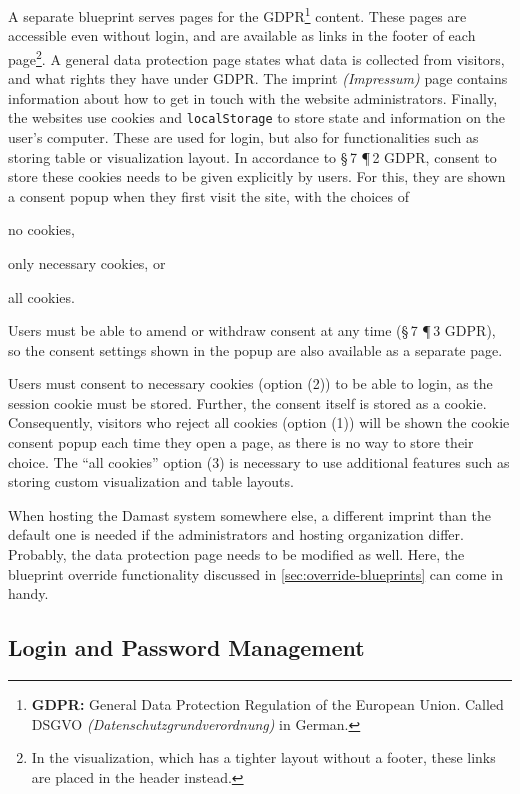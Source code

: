 A separate blueprint serves pages for the GDPR\footnote{
  \textbf{GDPR:} General Data Protection Regulation of the European Union.
  Called DSGVO \emph{(Datenschutzgrundverordnung)} in German.
}
content.
These pages are accessible even without login, and are available as links in the footer of each page\footnote{
  In the visualization, which has a tighter layout without a footer, these links are placed in the header instead.
}.
A general data protection page states what data is collected from visitors, and what rights they have under GDPR.
The imprint \emph{(Impressum)} page contains information about how to get in touch with the website administrators.
Finally, the websites use cookies and \verb!localStorage! to store state and information on the user's computer.
These are used for login, but also for functionalities such as storing table or visualization layout.
In accordance to \S\,7 \P\,2 GDPR, consent to store these cookies needs to be given explicitly by users.
For this, they are shown a consent popup when they first visit the site, with the choices of
\begin{enumerate*}[label=(\arabic*)]
  \item no cookies,
  \item only necessary cookies, or
  \item all cookies.
\end{enumerate*}
Users must be able to amend or withdraw consent at any time (\S\,7 \P\,3 GDPR), so the consent settings shown in the popup are also available as a separate page.

Users must consent to necessary cookies (option (2)) to be able to login, as the session cookie must be stored.
Further, the consent itself is stored as a cookie.
Consequently, visitors who reject all cookies (option (1)) will be shown the cookie consent popup each time they open a page, as there is no way to store their choice.
The \enquote{all cookies} option (3) is necessary to use additional features such as storing custom visualization and table layouts.

When hosting the Damast system somewhere else, a different imprint than the default one is needed if the administrators and hosting organization differ.
Probably, the data protection page needs to be modified as well.
Here, the blueprint override functionality discussed in \cref{sec:override-blueprints} can come in handy.


\subsection{Login and Password Management}

